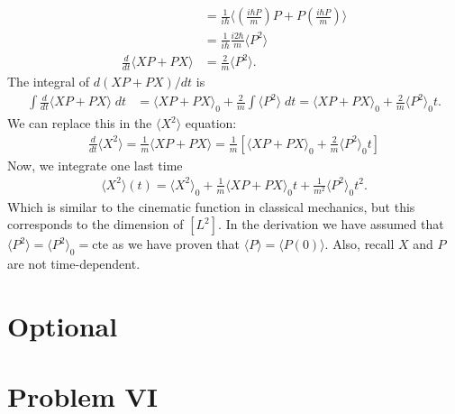 \documentclass[letterpaper,11pt,twoside]{article}
\newcommand{\braket}[1]{\langle#1\rangle}
\begin{document}
\begin{enumerate}[itemsep=0pt,topsep=0pt,label=\alph*.]
{\begin{align*}
    &=\frac{1}{i\hbar}\braket{\left(\frac{i\hbar P}{m}\right)P+P\left(\frac{i\hbar P}{m}\right)}\\
    &=\frac{1}{i\hbar}\frac{i2\hbar}{m}\braket{P^2}\\
    \frac{d}{dt}\braket{XP+PX}&=\frac{2}{m}\braket{P^2}.
  \end{align*}}
  The integral of $d(XP+PX)/dt$ is
  \begin{align*}
    \int\frac{d}{dt}\braket{XP+PX}\;dt&=\braket{XP+PX}_0+\frac{2}{m}\int\braket{P^2}\;dt=\braket{XP+PX}_0+\frac{2}{m}\braket{P^2}_0t.
  \end{align*}
  We can replace this in the $\braket{X^2}$ equation:
  \begin{align*}
    \frac{d}{dt}\braket{X^2}=\frac{1}{m}\braket{XP+PX}=\frac{1}{m}\left[\braket{XP+PX}_0+\frac{2}{m}\braket{P^2}_0t\right]
  \end{align*}
  Now, we integrate one last time
  \begin{align*}
    \braket{X^2}(t)=\braket{X^2}_0+\frac{1}{m}\braket{XP+PX}_0t+\frac{1}{m^2}\braket{P^2}_0t^2.
  \end{align*}
  Which is similar to the cinematic function in classical mechanics, but this corresponds to the dimension of $[L^2]$. In the derivation we have assumed that $\braket{P^2}=\braket{P^2}_0=\text{cte}$ as we have 
  proven that $\braket{P}=\braket{P(0)}$. Also, recall $X$ and $P$ are not time-dependent.
\end{enumerate}

\section*{Optional}
\section*{Problem VI}
\end{document}

